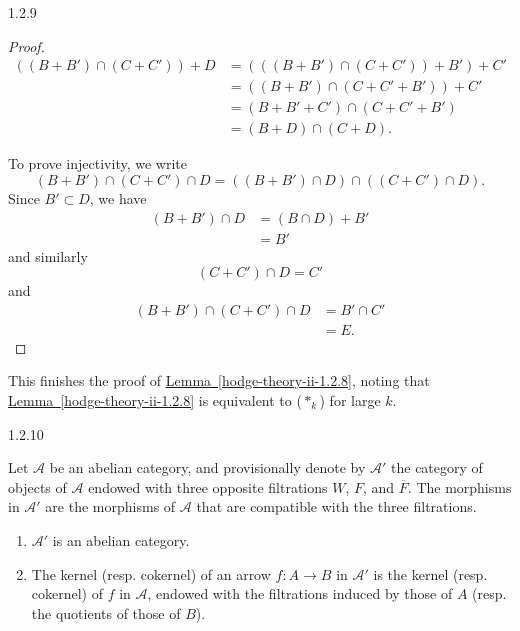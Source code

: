 \begin{lemma}{1.2.9}
\begin{proof}
      \[         \begin {aligned}           ((B+B')\cap (C+C'))+D           &= (((B+B')\cap (C+C'))+B')+C'         \\&= ((B+B')\cap (C+C'+B'))+C'         \\&= (B+B'+C')\cap (C+C'+B')         \\&= (B+D)\cap (C+D).         \end {aligned}       \]\par{}To prove injectivity, we write
      \[         (B+B')\cap (C+C')\cap  D         = ((B+B')\cap  D)\cap ((C+C')\cap  D).       \]
      Since \(B'\subset  D\), we have
      \[         \begin {aligned}           (B+B')\cap  D           &= (B\cap  D)+B'         \\&= B'         \end {aligned}       \]
      and similarly
      \[         (C+C')\cap  D         = C'       \]
      and
      \[         \begin {aligned}           (B+B')\cap (C+C')\cap  D           &= B'\cap  C'         \\&= E.         \end {aligned}       \]\end{proof}\end{lemma}\par{}This finishes the proof of \hyperref[hodge-theory-ii-1.2.8]{Lemma~\ref*{hodge-theory-ii-1.2.8}}, noting that \hyperref[hodge-theory-ii-1.2.8]{Lemma~\ref*{hodge-theory-ii-1.2.8}} is equivalent to (\(*_k\)) for large \(k\).\begin{theorem}{1.2.10}\label{hodge-theory-ii-1.2.10}\skipsinglepar\par{}Let \(\mathscr {A}\) be an abelian category, and provisionally denote by \(\mathscr {A}'\) the category of objects of \(\mathscr {A}\) endowed with three opposite filtrations \(W\), \(F\), and \(\overline {F}\).
    The morphisms in \(\mathscr {A}'\) are the morphisms of \(\mathscr {A}\) that are compatible with the three filtrations.

    
 \begin{enumerate}
      
 \item[(i)]
        \(\mathscr {A}'\) is an abelian category.
      

      
 \item[(ii)]
        The kernel (resp. cokernel) of an arrow \(f\colon  A\to  B\) in \(\mathscr {A}'\) is the kernel (resp. cokernel) of \(f\) in \(\mathscr {A}\), endowed with the filtrations induced by those of \(A\) (resp. the quotients of those of \(B\)).
      


\end{enumerate}
\end{theorem}
